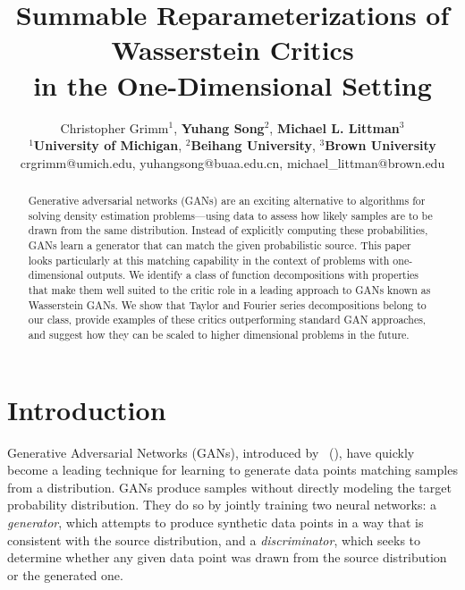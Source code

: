 \documentclass[letterpaper]{article} %
\newcommand{\namecite}[1]{\citeauthor{#1}~(\citeyear{#1})}
\begin{document}
%
\title{Summable Reparameterizations of Wasserstein Critics\\  in the One-Dimensional Setting}
\author{Christopher Grimm$^1$, \textbf{Yuhang Song}$^2$, \textbf{Michael L. Littman}$^3$ \\
  $^{1}$\textbf{University of Michigan}, $^{2}$\textbf{Beihang University},  $^{3}$\textbf{Brown University}\\
  crgrimm@umich.edu, yuhangsong@buaa.edu.cn, michael\_littman@brown.edu}
\maketitle
\begin{abstract}
Generative adversarial networks (GANs) are an exciting alternative to algorithms for solving density estimation problems---using data to assess how likely samples are to be drawn from the same distribution. Instead of explicitly computing these probabilities, GANs learn a generator that can match the given probabilistic source. This paper looks particularly at this matching capability in the context of problems with one-dimensional outputs. We identify a class of function decompositions with properties that make them well suited to the critic role in a leading approach to GANs known as Wasserstein GANs. We show that Taylor and Fourier series decompositions belong to our class, provide examples of these critics outperforming standard GAN approaches, and suggest how they can be scaled to higher dimensional problems in the future.
\end{abstract}

\section{Introduction}
Generative Adversarial Networks (GANs), introduced by \namecite{goodfellow2014generative}, have quickly become a leading technique for learning to generate data points matching samples from a distribution. GANs produce samples without directly modeling the target probability distribution. They do so by jointly training two neural networks: a \emph{generator}, which attempts to produce synthetic data points in a way that is consistent with the source distribution, and a \emph{discriminator}, which seeks to determine whether any given data point was drawn from the source distribution or the generated one.
\end{document}
